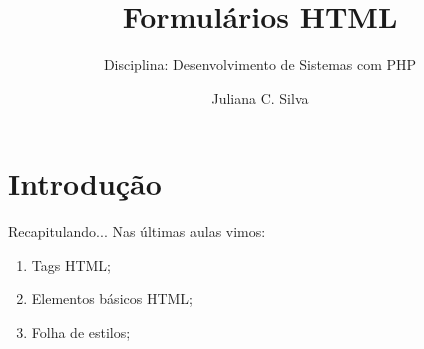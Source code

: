 \documentclass{beamer}
\title[HTML + CSS]{Formulários HTML}
\subtitle{Disciplina: Desenvolvimento de Sistemas com PHP}
\author{Juliana C. Silva}
\institute{Universidade Positivo}
\begin{document}
\frame{\titlepage}
 

\section{Introdução}
\begin{frame}{Recapitulando...}
Nas últimas aulas vimos:
  \begin{enumerate}
   \item Tags HTML;
   \item Elementos básicos HTML;
   \item Folha de estilos;
  \end{enumerate}
\end{frame}
\end{document}

